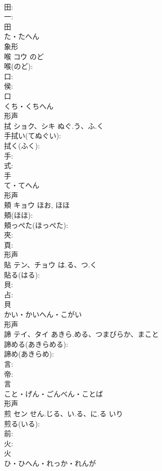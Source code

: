 \documentclass[8pt]{extreport}
\begin{document}
\begin{CJK}{UTF8}{min}
\\	田: 
\\	一: 
\\	田	
\\	た・たへん	
\\	象形 
\\	喉	コウ	のど		
\\	喉(のど): 
\\	口: 
\\	侯: 
\\	口	
\\	くち・くちへん	
\\	形声 
\\	拭	ショク、シキ	ぬぐ.う、ふ.く		
\\	手拭い(てぬぐい): 
\\	拭く(ふく): 
\\	手: 
\\	式: 
\\	手	
\\	て・てへん	
\\	形声 
\\	頬	キョウ	ほお, ほほ		
\\	頬(ほほ): 
\\	頬っぺた(ほっぺた): 
\\	夾: 
\\	頁: 
\\	形声 
\\	貼	テン、チョウ	は.る、つ.く		
\\	貼る(はる): 
\\	貝: 
\\	占: 
\\	貝	
\\	かい・かいへん・こがい	
\\	形声 
\\	諦	テイ、タイ	あきら.める、つまびらか、まこと		
\\	諦める(あきらめる): 
\\	諦め(あきらめ): 
\\	言: 
\\	帝: 
\\	言	
\\	こと・げん・ごんべん・ことば	
\\	形声 
\\	煎	セン	せん.じる、い.る、に.る	いり	
\\	煎る(いる): 
\\	前: 
\\	火: 
\\	火	
\\	ひ・ひへん・れっか・れんが	

\end{CJK}
\end{document}
